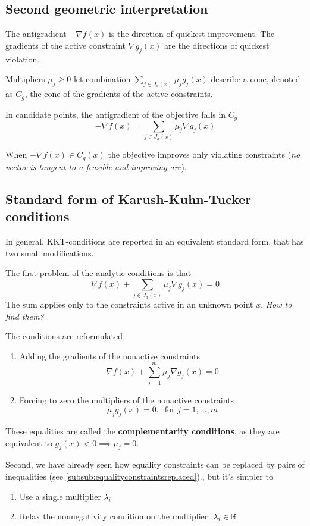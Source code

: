 \subsection{Second geometric interpretation}

The antigradient $- \nabla f(x)$ is the direction of quickest improvement. The gradients of the active constraint $\nabla g_j (x)$ are the directions of quickest violation.

Multipliers $\mu_j \geq 0$ let combination $\sum_{j \in J_a (x)} \mu_j g_j (x)$ describe a cone, denoted as $C_g$, the cone of the gradients of the active constraints.

In candidate points, the antigradient of the objective falls in $C_g$
$$ - \nabla f(x) = \sum_{j \in J_a (x)} \mu_j \nabla g_j (x) $$

When $-\nabla f(x) \in C_g (x)$ the objective improves only violating constraints (\textit{no vector is tangent  to a feasible and improving arc}).

\subsection{Standard form of Karush-Kuhn-Tucker conditions}

In general, KKT-conditions are reported in an equivalent standard form, that has two small modifications. 

The first problem of the analytic conditions is that
$$ \nabla f(x) + \sum_{j \in J_a (x)} \mu_j \nabla g_j (x) = 0 $$
The sum applies only to the constraints active in an unknown point $x$. \textit{How to find them?}

The conditions are reformulated
\begin{enumerate}
	\item Adding the gradients of the nonactive constraints
	$$ \nabla f(x) + \sum_{j = 1}^m \mu_j \nabla g_j (x) = 0 $$
	
	\item Forcing to zero the multipliers of the nonactive constraints 
	$$ \mu_j g_j (x) = 0, \ \text{ for } j = 1, \dots, m $$
\end{enumerate}
These equalities are called the \textbf{complementarity conditions}, as they are equivalent to $g_j (x) < 0 \implies \mu_j = 0$.

Second, we have already seen how equality constraints can be replaced by pairs of inequalities (see \ref{subsub:equalityconstraintsreplaced})., but it's simpler to
\begin{enumerate}
	\item Use a single multiplier $\lambda_i$
	
	\item Relax the nonnegativity condition on the multiplier: $\lambda_i \in \operatorname{\mathbb{R}}$
\end{enumerate}

